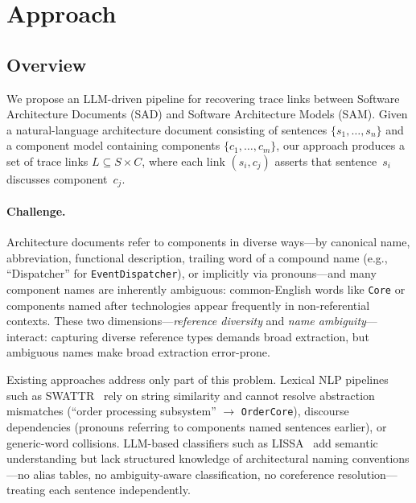 
\section{Approach}\label{sec:approach}

\subsection{Overview}\label{sec:overview}

We propose an LLM-driven pipeline for recovering trace links between
Software Architecture Documents (SAD) and Software Architecture Models (SAM).
Given a natural-language architecture document consisting of sentences
$\{s_1, \ldots, s_n\}$ and a component model containing components
$\{c_1, \ldots, c_m\}$, our approach produces a set of trace links
$L \subseteq S \times C$, where each link $(s_i, c_j)$ asserts that
sentence~$s_i$ discusses component~$c_j$.

\paragraph{Challenge.}
Architecture documents refer to components in diverse ways---by
canonical name, abbreviation, functional description, trailing
word of a compound name (e.g., ``Dispatcher'' for
\texttt{EventDispatcher}), or implicitly via pronouns---and many
component names are inherently ambiguous: common-English words
like \texttt{Core} or components named after technologies
appear frequently in non-referential contexts.
These two dimensions---\emph{reference diversity} and \emph{name
ambiguity}---interact: capturing diverse reference types demands
broad extraction, but ambiguous names make broad extraction
error-prone.

Existing approaches address only part of this problem.
Lexical NLP pipelines such as SWATTR~\cite{TODO:swattr} rely on
string similarity and cannot resolve abstraction mismatches
(``order processing subsystem'' $\to$ \texttt{OrderCore}),
discourse dependencies (pronouns referring to components named
sentences earlier), or generic-word collisions.
LLM-based classifiers such as LISSA~\cite{TODO:lissa} add
semantic understanding but lack structured knowledge of
architectural naming conventions---no alias tables, no
ambiguity-aware classification, no coreference resolution---treating
each sentence independently.


